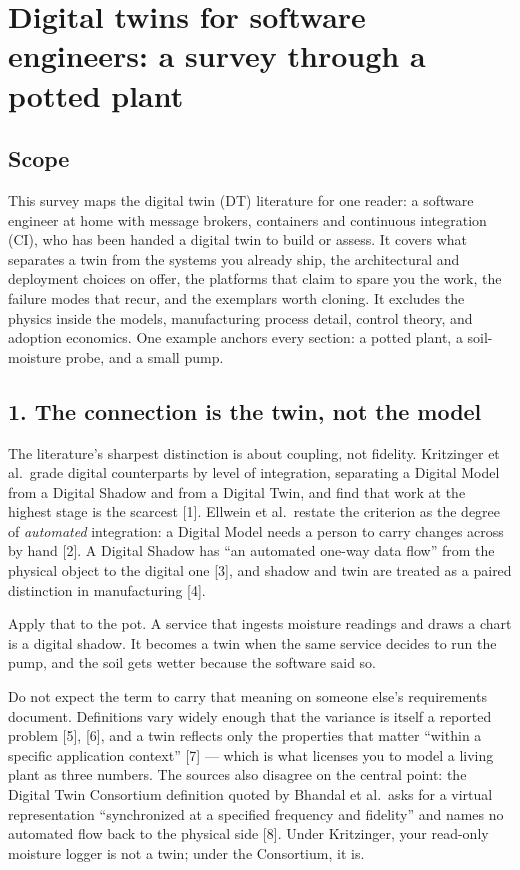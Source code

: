 \documentclass[
  12pt,
  a4paper,
]{article}
\author{}
\date{}
\begin{document}
\section{Digital twins for software engineers: a survey through a potted
plant}\label{digital-twins-for-software-engineers-a-survey-through-a-potted-plant}

\subsection{Scope}\label{scope}

This survey maps the digital twin (DT) literature for one reader: a
software engineer at home with message brokers, containers and
continuous integration (CI), who has been handed a digital twin to build
or assess. It covers what separates a twin from the systems you already
ship, the architectural and deployment choices on offer, the platforms
that claim to spare you the work, the failure modes that recur, and the
exemplars worth cloning. It excludes the physics inside the models,
manufacturing process detail, control theory, and adoption economics.
One example anchors every section: a potted plant, a soil-moisture
probe, and a small pump.

\subsection{1. The connection is the twin, not the
model}\label{the-connection-is-the-twin-not-the-model}

The literature's sharpest distinction is about coupling, not fidelity.
Kritzinger et al.~grade digital counterparts by level of integration,
separating a Digital Model from a Digital Shadow and from a Digital
Twin, and find that work at the highest stage is the scarcest {[}1{]}.
Ellwein et al.~restate the criterion as the degree of \emph{automated}
integration: a Digital Model needs a person to carry changes across by
hand {[}2{]}. A Digital Shadow has ``an automated one-way data flow''
from the physical object to the digital one {[}3{]}, and shadow and twin
are treated as a paired distinction in manufacturing {[}4{]}.

Apply that to the pot. A service that ingests moisture readings and
draws a chart is a digital shadow. It becomes a twin when the same
service decides to run the pump, and the soil gets wetter because the
software said so.

Do not expect the term to carry that meaning on someone else's
requirements document. Definitions vary widely enough that the variance
is itself a reported problem {[}5{]}, {[}6{]}, and a twin reflects only
the properties that matter ``within a specific application context''
{[}7{]} --- which is what licenses you to model a living plant as three
numbers. The sources also disagree on the central point: the Digital
Twin Consortium definition quoted by Bhandal et al.~asks for a virtual
representation ``synchronized at a specified frequency and fidelity''
and names no automated flow back to the physical side {[}8{]}. Under
Kritzinger, your read-only moisture logger is not a twin; under the
Consortium, it is.
\end{document}
